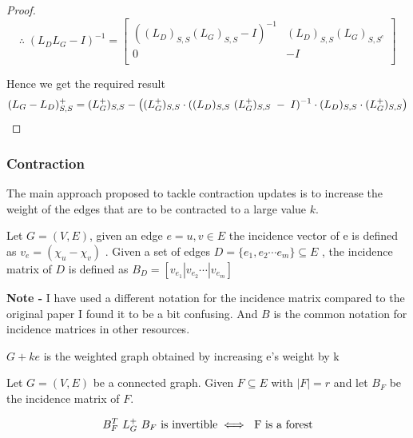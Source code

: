 \begin{proof}
$$\therefore \; (L_DL_G - I)^{-1} = 
\begin{bmatrix}
((L_D)_{S,S} (L_G)_{S,S} - I)^{-1} & (L_D)_{S,S}(L_G)_{S,S^c} \\
0 & -I \\
\end{bmatrix}
$$

Hence we get the required result 
  $$ (L_G - L_D)_{S,S}^+ = (L_{G}^{+})_{S,S} - \left( (L_{G}^{+})_{S,S} \cdot ((L_D)_{S,S} \  (L_{G}^{+})_{S,S} \; - \; I)^{-1} \cdot (L_D)_{S,S} \cdot (L_{G}^{+})_{S,S} \right) $$ 
  
\end{proof}


\subsubsection{Contraction}

The main approach proposed to tackle contraction updates is to increase the weight of the edges that are to be contracted to a large value $k$. 

\begin{HXd}
Let $G = (V,E)$, given an edge $e = {u,v} \in E$ the incidence vector of e is defined as $v_e = (\chi_u - \chi_v)$ . Given a set of edges $D = \{e_1, e_2 \cdots e_m\} \subseteq E$ , the incidence matrix of $D$ is defined as $B_D = [v_{e_1} | v_{e_2} \cdots | v_{e_m}]$ 

\textbf{Note - } I have used a different notation for the incidence matrix compared to the original paper I found it to be a bit confusing. And $B$ is the common notation for incidence matrices in other resources. 

\end{HXd}

\begin{HXd}[$G + ke$]
 $G + ke$ is the weighted graph obtained by increasing e's weight by k
\end{HXd}


\begin{HXl}
 Let $G = (V, E)$ be a connected graph. Given $F \subseteq E$ with $|F| = r$ and let $B_F$ be the incidence matrix of $F$.
 
 $$ B_F^T \ L_{G}^{+} \ B_F \ \text{is invertible} \iff \text{ F is a forest} $$
\end{HXl}

